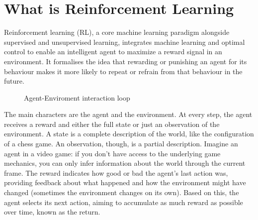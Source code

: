 \section{What is Reinforcement Learning}
Reinforcement learning (RL), a core machine learning paradigm alongside supervised and unsupervised learning, 
integrates machine learning and optimal control to enable an intelligent agent to maximize a reward signal in 
an environment. It formalises the idea that rewarding or punishing an agent for its behaviour makes it more 
likely to repeat or refrain from that behaviour in the future.
\begin{figure}[h!]
\centering
{}
\caption{Agent-Enviroment interaction loop}
\label{fig:rl loop}
\end{figure}

The main characters are the agent and the environment. At every step, the agent receives a reward and either the 
full state or just an observation of the environment. A state is a complete description of the world, like the 
configuration of a chess game. An observation, though, is a partial description. Imagine an agent in a video 
game: if you don’t have access to the underlying game mechanics, you can only infer information about the world 
through the current frame. The reward indicates how good or bad the agent’s last action was, providing feedback 
about what happened and how the environment might have changed (sometimes the environment changes on its own). 
Based on this, the agent selects its next action, aiming to accumulate as much reward as possible over time, 
known as the return.
